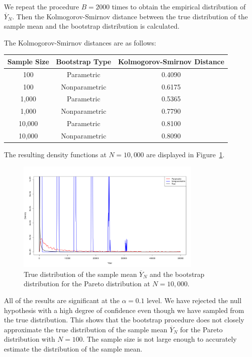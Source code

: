 \documentclass{article}
\begin{document}
We repeat the procedure \(B = 2000\) times to obtain the empirical distribution of \(\overline{Y}_N\). Then the Kolmogorov-Smirnov distance between the true distribution of the sample mean and the bootstrap distribution is calculated.

The Kolmogorov-Smirnov distances are as follows:

\begin{table}[h]
\centering
\begin{tabular}{|c|c|c|}
\hline
\textbf{Sample Size} & \textbf{Bootstrap Type} & \textbf{Kolmogorov-Smirnov Distance} \\ \hline
100 & Parametric & 0.4090 \\ \hline
100 & Nonparametric & 0.6175 \\ \hline
1,000 & Parametric & 0.5365 \\ \hline
1,000 & Nonparametric & 0.7790 \\ \hline
10,000 & Parametric & 0.8100 \\ \hline
10,000 & Nonparametric & 0.8090 \\ \hline
\end{tabular}
\end{table}

The resulting density functions at \(N = 10,000\) are displayed in Figure~\ref{fig:pareto_bootstrap}.

\begin{figure}[h]
\centering
\includegraphics[width=0.8\textwidth]{pareto_bootstrap_distributions.png}
\caption{True distribution of the sample mean \(\overline{Y}_N\) and the bootstrap distribution for the Pareto distribution at \(N = 10,000\).}
\label{fig:pareto_bootstrap}
\end{figure}

All of the results are significant at the \(\alpha = 0.1\) level. We have rejected the null hypothesis with a high degree of confidence even though we have sampled from the true distribution. This shows that the bootstrap procedure does not closely approximate the true distribution of the sample mean \(\overline{Y}_N\) for the Pareto distribution with \(N = 100\). The sample size is not large enough to accurately estimate the distribution of the sample mean.
\end{document}
